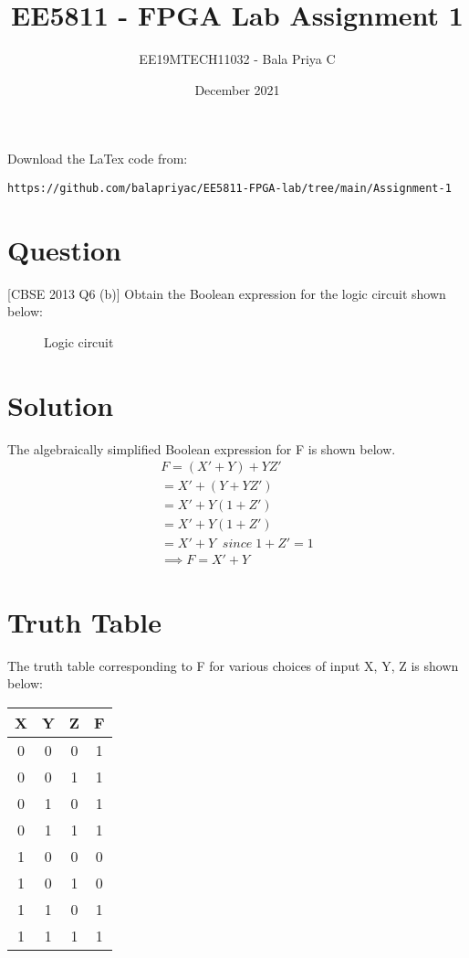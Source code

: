 \documentclass[journal,12pt,twocolumn]{IEEEtran}
\title{EE5811 - FPGA Lab Assignment 1}
\author{EE19MTECH11032 - Bala Priya C}
\date{December 2021}
\numberwithin{equation}{section}
\begin{document}
\maketitle
Download the LaTex code from:
\begin{lstlisting}
https://github.com/balapriyac/EE5811-FPGA-lab/tree/main/Assignment-1
\end{lstlisting}

\section{Question}

[CBSE 2013 Q6 (b)] Obtain the Boolean expression for the logic circuit shown below:

\begin{figure}[h!]
    \centering
    
    \caption{Logic circuit}
    \label{fig:circuit}
\end{figure}

\section{Solution}
The algebraically simplified Boolean expression for F is shown below.
\begin{align}
F = (X' + Y) + YZ' \\
= X' + (Y + YZ')\\
= X' + Y(1 + Z')\\
= X' + Y(1 + Z')\\
= X' + Y  \;\; since \; 1 + Z' = 1\\
\implies F = X' + Y
\end{align}

\section{Truth Table}
The truth table corresponding to F for various choices of input X, Y, Z is shown below:
\medskip

    \centering
          \begin{tabular}{|c|c|c|c|}
            \hline
            X & Y & Z & F \\
            \hline
            0 & 0 & 0 & 1\\
            \hline
             0 & 0 & 1 & 1\\
            \hline
             0 & 1 & 0 & 1\\
            \hline
             0 & 1 & 1 & 1\\
            \hline
            1 & 0 & 0 & 0\\
            \hline
            1 & 0 & 1 & 0\\
            \hline
            1 & 1 & 0 & 1\\
            \hline
            1 & 1 & 1 & 1\\
            \hline
            
        \end{tabular}
     
\end{document}
